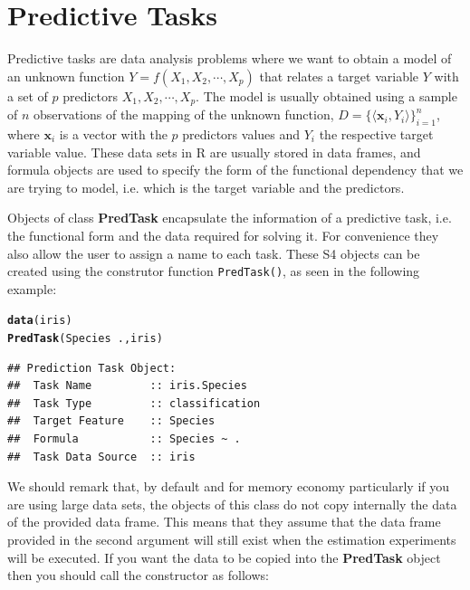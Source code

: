 \documentclass[10pt,a4paper]{article}\usepackage[]{graphicx}\usepackage[]{color}
\makeatletter
\newcommand{\hlopt}[1]{\textcolor[rgb]{0,0,0}{#1}}%
\newcommand{\hlstd}[1]{\textcolor[rgb]{0.345,0.345,0.345}{#1}}%
\newcommand{\hlkwd}[1]{\textcolor[rgb]{0.737,0.353,0.396}{\textbf{#1}}}%
\newenvironment{kframe}{%
 \def\at@end@of@kframe{}%
 \ifinner\ifhmode%
  \def\at@end@of@kframe{\end{minipage}}%
  \begin{minipage}{\columnwidth}%
 \fi\fi%
 \def\FrameCommand##1{\hskip\@totalleftmargin \hskip-\fboxsep
 \colorbox{shadecolor}{##1}\hskip-\fboxsep
     \hskip-\linewidth \hskip-\@totalleftmargin \hskip\columnwidth}%
 \MakeFramed {\advance\hsize-\width
   \@totalleftmargin\z@ \linewidth\hsize
   \@setminipage}}%
 {\par\unskip\endMakeFramed%
 \at@end@of@kframe}
\newenvironment{knitrout}{}{} %
\makeatother
\begin{document}
\section{Predictive Tasks}

Predictive tasks are data analysis problems where we want to obtain a
model of an unknown function $Y=f(X_1, X_2, \cdots, X_p)$ that relates
a target variable $Y$ with a set of $p$ predictors $X_1, X_2, \cdots,
X_p$. The model is usually obtained using a sample of $n$ observations
of the mapping of the unknown function, $D=\{\langle \mathbf{x}_i,
Y_i\rangle\}_{i=1}^n$, where $\mathbf{x}_i$ is a vector with the $p$
predictors values and $Y_i$ the respective target variable value.  These data sets in R are usually stored in data
frames, and formula objects are used to specify the form of the
functional dependency that we are trying to model, i.e. which is the
target variable and the predictors.

Objects of class \textbf{PredTask} encapsulate the information of a
predictive task, i.e. the functional form and the data required for
solving it. For convenience they also allow the user to assign a name
to each task. These S4 objects can be created using the construtor
function \texttt{PredTask()}, as seen in the following example:

\begin{knitrout}\footnotesize
{}\color{fgcolor}\begin{kframe}
\begin{alltt}
\hlkwd{data}\hlstd{(iris)}
\hlkwd{PredTask}\hlstd{(Species} \hlopt{~} \hlstd{.,iris)}
\end{alltt}
\begin{verbatim}
## Prediction Task Object:
## 	Task Name         :: iris.Species 
## 	Task Type         :: classification 
## 	Target Feature    :: Species 
## 	Formula           :: Species ~ .
## 	Task Data Source  :: iris
\end{verbatim}
\end{kframe}
\end{knitrout}

We should remark that, by default and for memory economy particularly if you are using large data sets, the objects of this class do not copy internally the data of the provided data frame. This  means that they assume that the data frame provided in the second argument will still exist when the estimation experiments will be executed. If you want the data to be copied into the \textbf{PredTask} object then you should call the constructor as follows:
\end{document}
